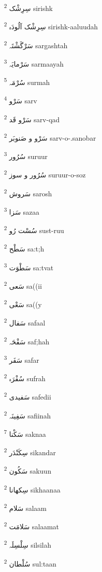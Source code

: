 \documentclass[12pt]{article}
\begin{document}
\begin{multicols}{5}
{\ur سِرِشْک}   \textsuperscript{2} sirishk

{\ur سِرِشْک آلُودَہ}   \textsuperscript{2} sirishk-aaluudah

{\ur سَرْگَشْتَہ}   \textsuperscript{2} sargashtah

{\ur سَرْمایَہ}   \textsuperscript{3} sarmaayah

{\ur سُرْمَہ}   \textsuperscript{5} surmah

{\ur سَرْو}   \textsuperscript{4} sarv

{\ur سَرْو قَد}   \textsuperscript{2} sarv-qad

{\ur سَرْو و صَنوبَر}   \textsuperscript{2} sarv-o-.sanobar

{\ur سُرُور}   \textsuperscript{3} suruur

{\ur سُرُور و سوز}   \textsuperscript{2} suruur-o-soz

{\ur سَروش}   \textsuperscript{2} sarosh

{\ur سَزا}   \textsuperscript{3} sazaa

{\ur سُسْت رُو}   \textsuperscript{2} sust-ruu

{\ur سَطْح}   \textsuperscript{2} sa:t;h

{\ur سَطْوَت}   \textsuperscript{3} sa:tvat

{\ur سَعی}   \textsuperscript{2} sa((ii

{\ur سَعْی}   \textsuperscript{2} sa((y

{\ur سَفال}   \textsuperscript{2} safaal

{\ur سَفْحَہ}   \textsuperscript{2} saf;hah

{\ur سَفَر}   \textsuperscript{3} safar

{\ur سُفْرَہ}   \textsuperscript{2} sufrah

{\ur سَفیدی}   \textsuperscript{2} safedii

{\ur سَفِینَہ}   \textsuperscript{2} safiinah

{\ur سَکْنا}   \textsuperscript{7} saknaa

{\ur سِکَنْدَر}   \textsuperscript{2} sikandar

{\ur سَکُون}   \textsuperscript{2} sakuun

{\ur سِکھانا}   \textsuperscript{2} sikhaanaa

{\ur سَلام}   \textsuperscript{2} salaam

{\ur سَلامَت}   \textsuperscript{2} salaamat

{\ur سِلْسِلَہ}   \textsuperscript{2} silsilah

{\ur سُلْطان}   \textsuperscript{2} sul:taan


\end{multicols}
\end{document}
